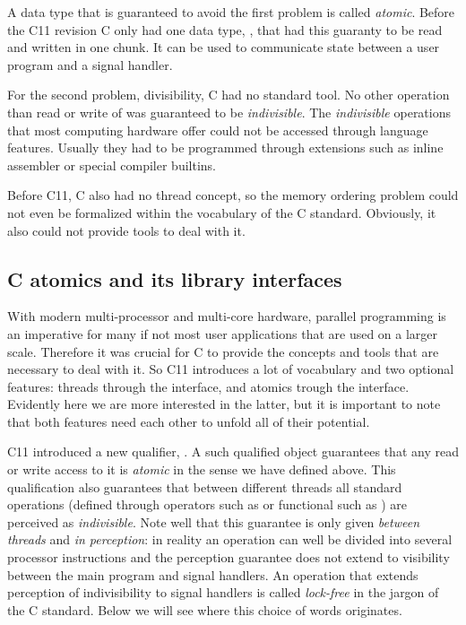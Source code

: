 \itemadjust
A data type that is guaranteed to avoid the first problem is called
\emph{atomic}. Before the C11 revision C only had one data type,
, that had this guaranty to be read and written in one
chunk. It can be used to communicate state between a user program
and a signal handler.

For the second problem, divisibility, C had no standard tool. No
other operation than read or write of  was guaranteed
to be \emph{indivisible}.  The \emph{indivisible} operations that most
computing hardware offer could not be accessed through language
features. Usually they had to be programmed through extensions such
as inline assembler or special compiler builtins.

Before C11, C also had no thread concept, so the memory ordering
problem could not even be formalized within the vocabulary of the C
standard. Obviously, it also could not provide tools to deal with
it.

\subsection{C atomics and its library interfaces}
\label{sec-2-1}

With modern multi-processor and multi-core hardware, parallel
programming is an imperative for many if not most user applications
that are used on a larger scale. Therefore it was crucial for C to
provide the concepts and tools that are necessary to deal with
it. So C11 introduces a lot of vocabulary and two optional
features: threads through the  interface, and atomics
trough the  interface. Evidently here we are more
interested in the latter, but it is important to note that both
features need each other to unfold all of their potential.

C11 introduced a new qualifier, . A such qualified object
guarantees that any read or write access to it is \emph{atomic} in the
sense we have defined above. This qualification also guarantees
that between different threads all standard operations (defined
through operators such as \code{+=} or functional such as
) are perceived as \emph{indivisible}. Note well that
this guarantee is only given \emph{between threads} and \emph{in perception}:
in reality an operation can well be divided into several processor
instructions and the perception guarantee does not extend to
visibility between the main program and signal handlers. An
operation that extends perception of indivisibility to signal
handlers is called \emph{lock-free} in the jargon of the C
standard. Below we will see where this choice of words originates.

